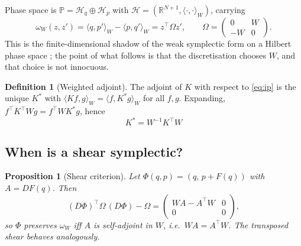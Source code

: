 \documentclass[11pt]{article}
\newtheorem{proposition}[theorem]{Proposition}
\theoremstyle{definition}
\newtheorem{definition}[theorem]{Definition}
\theoremstyle{remark}
\newcommand{\R}{\mathbb{R}}
\newcommand{\iprod}[2]{\langle #1, #2 \rangle}
\begin{document}
Phase space is $\mathbb{P}=\mathcal{H}_q\oplus\mathcal{H}_p$ with
$\mathcal{H}=(\R^{N+1},\iprod{\cdot}{\cdot}_W)$, carrying
\begin{equation}
\omega_W(z,z') = \iprod{q}{p'}_W - \iprod{p}{q'}_W = z^{\top}\Omega z',
\qquad
\Omega=\begin{pmatrix} 0 & W \\ -W & 0\end{pmatrix}.
\label{eq:omega}
\end{equation}
This is the finite-dimensional shadow of the weak symplectic form on a Hilbert
phase space \citep{weinstein1969symplectic,marsden1999mechanics}; the point of
what follows is that the discretisation chooses $W$, and that choice is not
innocuous.

\begin{definition}[Weighted adjoint]
The adjoint of $K$ with respect to \eqref{eq:ip} is the unique $K^{*}$ with
$\iprod{Kf}{g}_W=\iprod{f}{K^{*}g}_W$ for all $f,g$. Expanding,
$f^{\top}K^{\top}Wg=f^{\top}WK^{*}g$, hence
\begin{equation}
\boxed{\;K^{*}=W^{-1}K^{\top}W\;}
\label{eq:adjoint}
\end{equation}
\end{definition}

\subsection{When is a shear symplectic?}
\label{sec:criterion}

\begin{proposition}[Shear criterion]
\label{prop:shear}
Let $\Phi(q,p)=(q,\,p+F(q))$ with $A=DF(q)$. Then
\begin{equation}
(D\Phi)^{\top}\Omega\,(D\Phi)-\Omega
=\begin{pmatrix} WA - A^{\top}W & 0\\ 0 & 0\end{pmatrix},
\label{eq:defect-identity}
\end{equation}
so $\Phi$ preserves $\omega_W$ \emph{iff} $A$ is self-adjoint in $W$, i.e.\
$WA=A^{\top}W$. The transposed shear behaves analogously.
\end{proposition}
\end{document}
